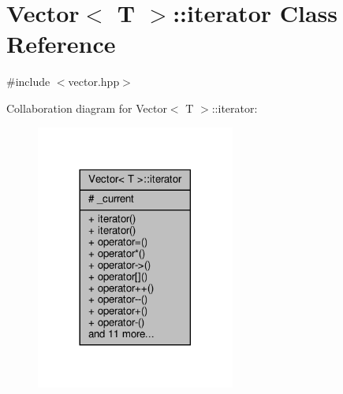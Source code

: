 \hypertarget{classVector_1_1iterator}{}\section{Vector$<$ T $>$\+:\+:iterator Class Reference}
\label{classVector_1_1iterator}


{\ttfamily \#include $<$vector.\+hpp$>$}



Collaboration diagram for Vector$<$ T $>$\+:\+:iterator\+:\nopagebreak
\begin{figure}[H]
\begin{center}
\leavevmode
\includegraphics[width=185pt]{classVector_1_1iterator__coll__graph}
\end{center}
\end{figure}
